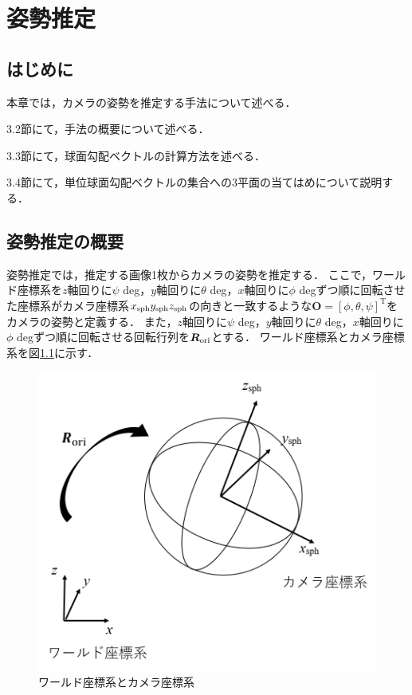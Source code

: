 \chapter{姿勢推定}
\thispagestyle{empty}
\label{chap3}
\minitoc


\newpage
\section{はじめに}

本章では，カメラの姿勢を推定する手法について述べる．

3.2節にて，手法の概要について述べる．

3.3節にて，球面勾配ベクトルの計算方法を述べる．

3.4節にて，単位球面勾配ベクトルの集合への3平面の当てはめについて説明する．

\newpage
\section{姿勢推定の概要}

姿勢推定では，推定する画像1枚からカメラの姿勢を推定する．
ここで，ワールド座標系を$z$軸回りに$\psi$ deg，$y$軸回りに$\theta$ deg，$x$軸回りに$\phi$ degずつ順に回転させた座標系がカメラ座標系$x_{\rm{sph}}y_{\rm{sph}}z_{\rm{sph}}$の向きと一致するような$\bm{O}=[\phi, \theta, \psi]^{\mathrm{T}}$をカメラの姿勢と定義する．
また，$z$軸回りに$\psi$ deg，$y$軸回りに$\theta$ deg，$x$軸回りに$\phi$ degずつ順に回転させる回転行列を$\bm{R}_{\rm{ori}}$とする．
ワールド座標系とカメラ座標系を図\ref{fig:orientation}に示す．
\\

\begin{figure}[b]
 \begin{center}
 \includegraphics[width=0.6\columnwidth]{./chap3/fig/orientation.png}
 \caption{ワールド座標系とカメラ座標系}
 \label{fig:orientation}
 \end{center}
\end{figure}

